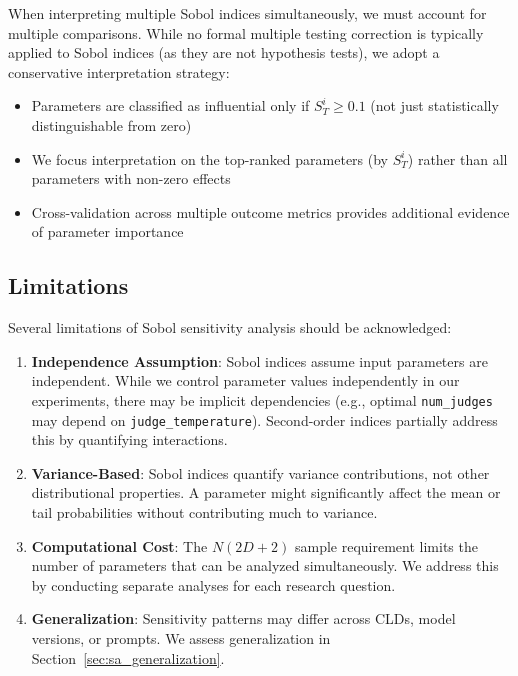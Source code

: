 When interpreting multiple Sobol indices simultaneously, we must account for multiple comparisons. While no formal multiple testing correction is typically applied to Sobol indices (as they are not hypothesis tests), we adopt a conservative interpretation strategy:

\begin{itemize}
    \item Parameters are classified as influential only if $S_T^i \geq 0.1$ (not just statistically distinguishable from zero)
    \item We focus interpretation on the top-ranked parameters (by $S_T^i$) rather than all parameters with non-zero effects
    \item Cross-validation across multiple outcome metrics provides additional evidence of parameter importance
\end{itemize}

\subsection{Limitations}

Several limitations of Sobol sensitivity analysis should be acknowledged:

\begin{enumerate}
    \item \textbf{Independence Assumption}: Sobol indices assume input parameters are independent. While we control parameter values independently in our experiments, there may be implicit dependencies (e.g., optimal \texttt{num\_judges} may depend on \texttt{judge\_temperature}). Second-order indices partially address this by quantifying interactions.
    
    \item \textbf{Variance-Based}: Sobol indices quantify variance contributions, not other distributional properties. A parameter might significantly affect the mean or tail probabilities without contributing much to variance.
    
    \item \textbf{Computational Cost}: The $N(2D + 2)$ sample requirement limits the number of parameters that can be analyzed simultaneously. We address this by conducting separate analyses for each research question.
    
    \item \textbf{Generalization}: Sensitivity patterns may differ across CLDs, model versions, or prompts. We assess generalization in Section~\ref{sec:sa_generalization}.
\end{enumerate}

